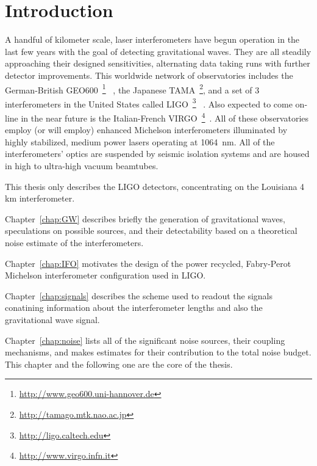%
%
%
%
\chapter*{Introduction}

A handful of kilometer scale, laser interferometers have begun operation in the
last few years with the goal of detecting gravitational waves.
They are all steadily approaching their designed sensitivities, alternating data 
taking runs with further detector improvements.
This worldwide network of observatories includes the German-British 
GEO600~\footnote{
\href{http://www.geo600.uni-hannover.de}{http://www.geo600.uni-hannover.de}}
~\cite{GEO:StatusCQG}, 
the Japanese TAMA~\footnote{
\href{http://tamago.mtk.nao.ac.jp}{http://tamago.mtk.nao.ac.jp}}\cite{TAMA:StatusCQG},
and a set of 3 interferometers in the United States called 
LIGO~\footnote{
\href{http://ligo.caltech.edu}{http://ligo.caltech.edu}}
~\cite{LIGO:StatusCQG,Rai:PhysicsToday}. 
Also expected to come on-line in the near future is the Italian-French
VIRGO~\footnote{
\href{http://www.virgo.infn.it}{http://www.virgo.infn.it}}~\cite{VIRGO:StatusCQG}.
All of these
observatories employ (or will employ) enhanced Michelson interferometers illuminated 
by highly stabilized, medium power lasers operating at 1064~nm. All of the 
interferometers' optics are suspended by seismic isolation systems and 
are housed in high to ultra-high vacuum beamtubes.

This thesis only describes the LIGO detectors, concentrating on the
Louisiana 4 km interferometer.

Chapter~\ref{chap:GW} describes briefly the generation of gravitational waves,
speculations on possible sources, and their detectability based on a theoretical
noise estimate of the interferometers.

Chapter~\ref{chap:IFO} motivates the design of the power recycled, 
Fabry-Perot Michelson interferometer configuration used in LIGO.

Chapter~\ref{chap:signals} describes the scheme
used to readout the signals conatining information about the interferometer
lengths and also the gravitational wave signal.

Chapter~\ref{chap:noise} lists all of the significant noise sources, their
coupling mechanisms, and makes estimates for their contribution to the total
noise budget. This chapter and the following one are the core of the thesis.

